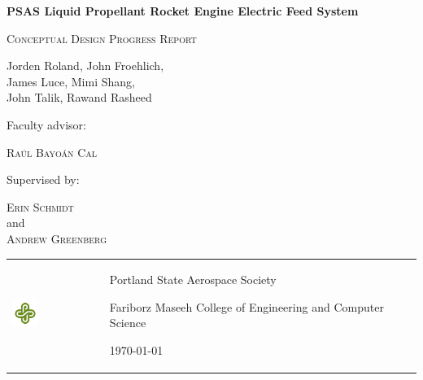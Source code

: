 \documentclass[11pt,twoside,a4paper,openright]{report}
\begin{document}
\begin{titlepage}

\vfil
	\centering
	{\huge\bfseries PSAS Liquid Propellant Rocket Engine
Electric Feed System\par}
	\vspace{0.5cm}
	{\scshape\Large Conceptual Design Progress Report\par}%

\vspace{2cm}

	{\Large\itshape 	{Jorden Roland, 
John Froehlich,\\
James Luce, 
Mimi Shang,\\
John Talik, 
Rawand Rasheed\par}}

\vspace{3cm}
Faculty advisor:\par
    \textsc{Ra\'{u}l Bayo\'{a}n Cal}\par
	Supervised by:\par
    \textsc{Erin Schmidt}\\
	and\\
	\textsc{Andrew Greenberg}

	\vspace{3cm}
	

\begin{table}[!t]

  \begin{tabular}{  p{2cm}  m{13.20337cm}  p{2cm}  }
  
\\ \hline

\begin{minipage}{.3\textwidth}
 \begin{flushleft}
      \includegraphics[width=0.3\textwidth]{logo.png}
 \end{flushleft}
\end{minipage}

&

\begin{center}
	{Portland State Aerospace Society}\par
	{Fariborz Maseeh College of Engineering and Computer Science}\par
	{\large \today \par}
	\end{center}


\end{tabular}
\end{table}
\end{titlepage}
\end{document}
